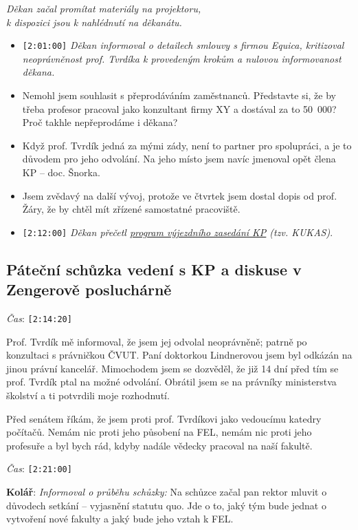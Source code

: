\documentclass[a4paper,10pt,notitlepage]{article}
\newcommand{\ts}[1]{\texttt{[#1]}}
\newcommand{\tsp}[1]{\noindent \textit{Čas}: \ts{#1}}
\newcommand{\cl}[1]{\noindent \textbf{#1}:}
\newcommand{\pozn}[1]{\begin{center}\textit{#1}\end{center}}
\newcommand{\tourl}[1]{http://www.fel.cvut.cz/senat/zapisy/#1}
\begin{document}
\pozn{Děkan začal promítat materiály na projektoru,\\k dispozici jsou k nahlédnutí na děkanátu.}

\begin{itemize}
\item \ts{2:01:00} \textit{Děkan informoval o detailech smlouvy s firmou Equica, kritizoval neoprávněnost prof. Tvrdíka k provedeným krokům a nulovou informovanost děkana.}
\item Nemohl jsem souhlasit s přeprodáváním zaměstnanců. Představte si, že by třeba profesor pracoval jako konzultant firmy XY a dostával za to 50~000? Proč takhle nepřeprodáme i děkana?
\item Když prof. Tvrdík jedná za mými zády, není to partner pro spolupráci, a je to důvodem pro jeho odvolání. Na jeho místo jsem navíc jmenoval opět člena KP -- doc. Šnorka.
\item Jsem zvědavý na další vývoj, protože ve čtvrtek jsem dostal dopis od prof. Žáry, že by chtěl mít zřízené samostatné pracoviště.
\item \ts{2:12:00} \textit{Děkan přečetl \href{\tourl{zapis12-kukas-program.doc}}{program výjezdního zasedání KP} (tzv. KUKAS)}.
\end{itemize}


\subsection{Páteční schůzka vedení s KP a diskuse v Zengerově posluchárně}

\tsp{2:14:20}

Prof. Tvrdík mě informoval, že jsem jej odvolal neoprávněně; patrně po konzultaci s právničkou ČVUT. Paní doktorkou Lindnerovou jsem byl odkázán na jinou právní kancelář. Mimochodem jsem se dozvěděl, že již 14 dní před tím se prof. Tvrdík ptal na možné odvolání. Obrátil jsem se na právníky ministerstva školství a ti potvrdili moje rozhodnutí.

Před senátem říkám, že jsem proti prof. Tvrdíkovi jako vedoucímu katedry počítačů. Nemám nic proti jeho působení na FEL, nemám nic proti jeho profesuře a byl bych rád, kdyby nadále vědecky pracoval na naší fakultě.

\tsp{2:21:00}

\cl{Kolář} \textit{Informoval o průběhu schůzky:} Na schůzce začal pan rektor mluvit o důvodech setkání -- vyjasnění statutu quo. Jde o to, jaký tým bude jednat o vytvoření nové fakulty a jaký bude jeho vztah k FEL.
\end{document}
